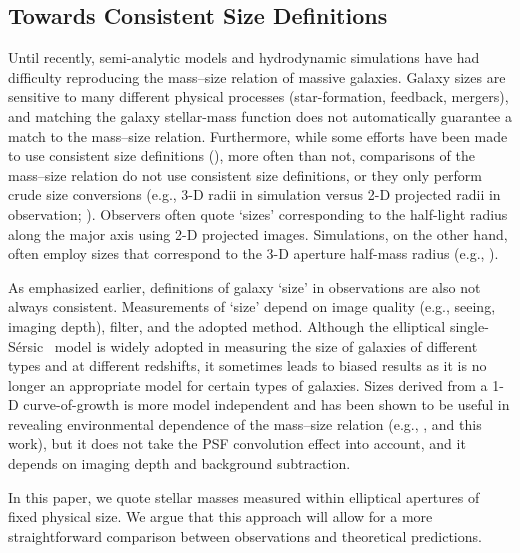\documentclass[a4paper,fleqn,usenatbib]{mnras}
\def\ser{{S\'{e}rsic\ }}
\begin{document}
\subsection{Towards Consistent Size Definitions}
        
    Until recently, semi-analytic models and hydrodynamic simulations have had
    difficulty reproducing the mass--size relation of massive galaxies. 
    Galaxy sizes are sensitive to many different physical processes (star-formation, 
    feedback, mergers), and matching the galaxy stellar-mass function does not 
    automatically guarantee a match to the mass--size relation. 
    Furthermore, while some efforts have been made to use consistent size definitions 
    (\citealt{McCarthy2017}), more often than not, comparisons of the mass--size relation 
    do not use consistent size definitions, or they only perform crude size conversions 
    (e.g., 3-D radii in simulation versus 2-D projected radii in observation; 
    \citealt{Genel2017}). 
    Observers often quote `sizes' corresponding to the half-light radius along the 
    major axis using 2-D projected images. 
    Simulations, on the other hand, often employ sizes that correspond to the 3-D 
    aperture half-mass radius (e.g., \citealt{Price2017}). 
    
    As emphasized earlier, definitions of galaxy `size' in observations are also not 
    always consistent. 
    Measurements of `size' depend on image quality (e.g., seeing, imaging depth), filter, 
    and the adopted method. 
    Although the elliptical single-\ser{} model is widely adopted in measuring the 
    size of galaxies of different types and at different redshifts, it sometimes leads
    to biased results as it is no longer an appropriate model for certain types of galaxies. 
    Sizes derived from a 1-D curve-of-growth is more model independent and has been 
    shown to be useful in revealing environmental dependence of the mass--size relation 
    (e.g., \citealt{Yoon2017}, and this work), but it does not take the PSF convolution 
    effect into account, and it depends on imaging depth and background subtraction.

    In this paper, we quote stellar masses measured within elliptical apertures of 
    fixed physical size. 
    We argue that this approach will allow for a more straightforward comparison 
    between observations and theoretical predictions.  
          
\end{document}
